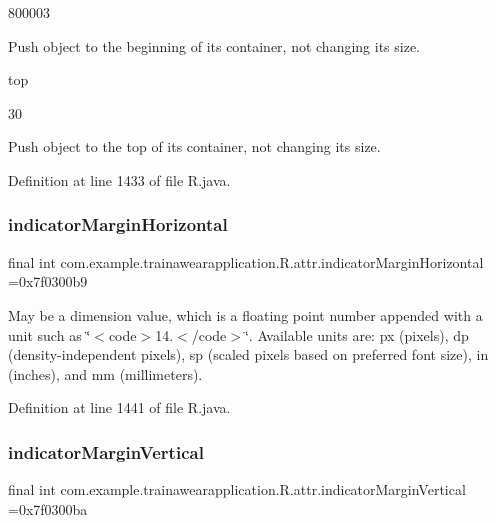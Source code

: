800003

Push object to the beginning of its container, not changing its size. 

top

30

Push object to the top of its container, not changing its size. 

Definition at line 1433 of file R.\+java.

\mbox{\label{classcom_1_1example_1_1trainawearapplication_1_1_r_1_1attr_a43fa7f7a70bc53d67676f4be9a3d4a21}} 
\subsubsection{\texorpdfstring{indicatorMarginHorizontal}{indicatorMarginHorizontal}}
{\footnotesize\ttfamily final int com.\+example.\+trainawearapplication.\+R.\+attr.\+indicator\+Margin\+Horizontal =0x7f0300b9\hspace{0.3cm}{\ttfamily [static]}}

May be a dimension value, which is a floating point number appended with a unit such as \char`\"{}$<$code$>$14.\+5sp$<$/code$>$\char`\"{}. Available units are\+: px (pixels), dp (density-\/independent pixels), sp (scaled pixels based on preferred font size), in (inches), and mm (millimeters). 

Definition at line 1441 of file R.\+java.

\mbox{\label{classcom_1_1example_1_1trainawearapplication_1_1_r_1_1attr_a83df8b81af7cb1a0b0176af0b3dbe6ca}} 
\subsubsection{\texorpdfstring{indicatorMarginVertical}{indicatorMarginVertical}}
{\footnotesize\ttfamily final int com.\+example.\+trainawearapplication.\+R.\+attr.\+indicator\+Margin\+Vertical =0x7f0300ba\hspace{0.3cm}{\ttfamily [static]}}

